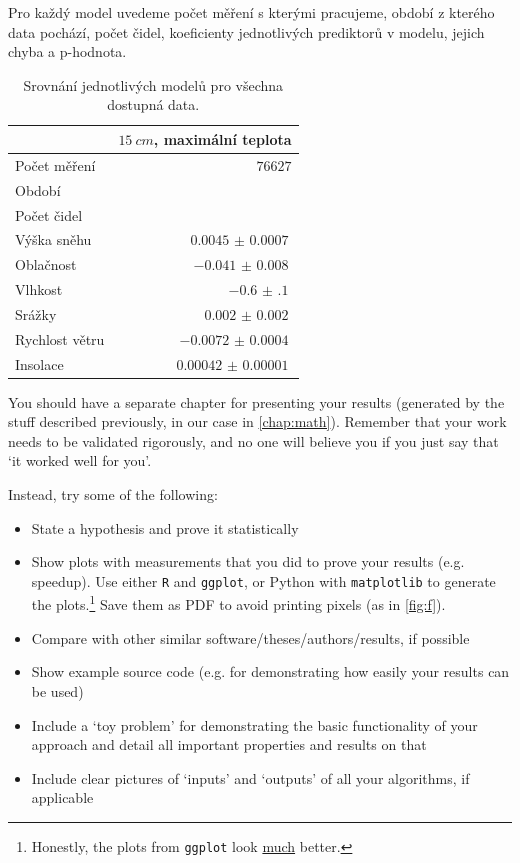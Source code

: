 Pro každý model uvedeme počet měření s kterými pracujeme, období z kterého data pochází, počet čidel, koeficienty jednotlivých prediktorů v modelu, jejich chyba a p-hodnota.

\begin{table}
\centering\footnotesize\sf
\begin{tabular}{lr}
\toprule
	& $\SI{15}{cm}$, maximální teplota \\
\midrule
Počet měření & $76627$\\
Období & \\
Počet čidel & \\
\midrule
	Výška sněhu & $\SI{0.0045(7)}{}$\\
	Oblačnost & $\SI{-0.041(8)}{}$\\
  Vlhkost & $\SI{-0.6(1)}{}$\\
  Srážky & $\SI{0.002(2)}{}$\\
  Rychlost větru & $\SI{-0.0072(4)}{}$\\
  Insolace & $\SI{0.00042(1)}{}$\\
\bottomrule
\end{tabular}
	\caption{Srovnání jednotlivých modelů pro všechna dostupná data.}
\label{tab:basicmodels}
\end{table}


You should have a separate chapter for presenting your results (generated by the stuff described previously, in our case in \cref{chap:math}). Remember that your work needs to be validated rigorously, and no one will believe you if you just say that `it worked well for you'.

Instead, try some of the following:
\begin{itemize}
\item State a hypothesis and prove it statistically
\item Show plots with measurements that you did to prove your results (e.g. speedup). Use either \texttt{R} and \texttt{ggplot}, or Python with \texttt{matplotlib} to generate the plots.\footnote{Honestly, the plots from \texttt{ggplot} look \underline{much} better.} Save them as PDF to avoid printing pixels (as in \cref{fig:f}).
\item Compare with other similar software/theses/authors/results, if possible
\item Show example source code (e.g. for demonstrating how easily your results can be used)
\item Include a `toy problem' for demonstrating the basic functionality of your approach and detail all important properties and results on that
\item Include clear pictures of `inputs' and `outputs' of all your algorithms, if applicable
\end{itemize}

